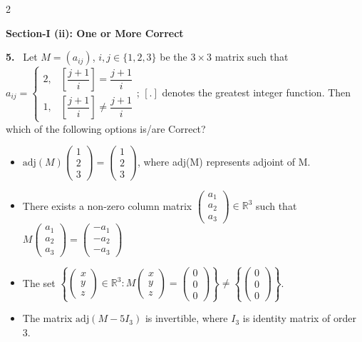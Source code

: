 \documentclass[10pt]{extarticle}
\newcommand{\sect}[1]{\par\smallskip\noindent\textbf{#1}\par}
\newcommand{\qn}[1]{\par\smallskip\noindent\textbf{#1.}~}
\newenvironment{qoptions}{\begin{itemize}[leftmargin=1.8em,itemsep=1pt,topsep=2pt,label={}]}{\end{itemize}}
\newcommand{\opt}[2]{\item[(#1)] #2}
\begin{document}
\begin{multicols}{2}
\sect{Section-I (ii): One or More Correct}

\qn{5} Let $M=(a_{ij})$, $i,j\in\{1,2,3\}$ be the $3\times3$ matrix such that $a_{ij}=\begin{cases}2, & \left[\dfrac{j+1}{i}\right]=\dfrac{j+1}{i}\\[2mm] 1, & \left[\dfrac{j+1}{i}\right]\neq\dfrac{j+1}{i}\end{cases}$; $[.]$ denotes the greatest integer function. Then which of the following options is/are Correct?
\begin{qoptions}
\opt{A}{$\text{adj}(M)\begin{pmatrix}1\\2\\3\end{pmatrix}=\begin{pmatrix}1\\2\\3\end{pmatrix}$, where adj(M) represents adjoint of M.}
\opt{B}{There exists a non-zero column matrix $\begin{pmatrix}a_1\\a_2\\a_3\end{pmatrix}\in\mathbb R^3$ such that $M\begin{pmatrix}a_1\\a_2\\a_3\end{pmatrix}=\begin{pmatrix}-a_1\\-a_2\\-a_3\end{pmatrix}$}
\opt{C}{The set $\left\{\begin{pmatrix}x\\y\\z\end{pmatrix}\in\mathbb R^3: M\begin{pmatrix}x\\y\\z\end{pmatrix}=\begin{pmatrix}0\\0\\0\end{pmatrix}\right\}\neq\left\{\begin{pmatrix}0\\0\\0\end{pmatrix}\right\}$.}
\opt{D}{The matrix $\text{adj}(M-5I_3)$ is invertible, where $I_3$ is identity matrix of order 3.}
\end{qoptions}


\end{multicols}
\end{document}
